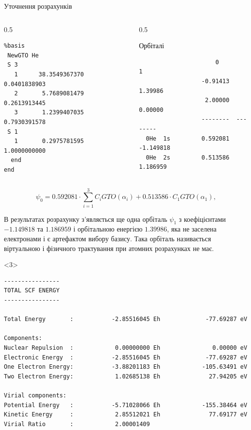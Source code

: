 \documentclass[10pt]{beamer}
\begin{document}
\begin{frame}[fragile]{Уточнення розрахунків}
\begin{onlyenv}
\begin{columns}[T]
\begin{column}{0.5\linewidth}
\begin{verbatim}
%basis
 NewGTO He
 S 3
   1      38.3549367370      0.0401838903
   2       5.7689081479      0.2613913445
   3       1.2399407035      0.7930391578
 S 1
   1       0.2975781595      1.0000000000
  end
end
    \end{verbatim}
			\end{column}
			\begin{column}{0.5\linewidth}\scriptsize\color{blue}
				\begin{center}
					\textcolor{black}{Орбіталі}
				\end{center}
				\begin{verbatim}
                      0         1
                  -0.91413   1.39986
                   2.00000   0.00000
                  --------  --------
  0He  1s         0.592081 -1.149818
  0He  2s         0.513586  1.186959
\end{verbatim}
			\end{column}
		\end{columns}
		\[
			\psi_{0} = 0.592081 \cdot \sum_{i = 1}^3 C_i GTO(\alpha_i)  + 0.513586 \cdot C_1  GTO(\alpha_1),
		\]
		\begin{alertblock}\scriptsize
			В результатах розрахунку з'являється ще одна орбіталь $\psi_1$ з коефіцієнтами $-1.149818$ та $1.186959$ і орбітальною енергією $1.39986$, яка не заселена електронами і є артефактом вибору базису. Така орбіталь називається \alert{віртуальною} і фізичного трактування при атомних розрахунках не має.
		\end{alertblock}
	\end{onlyenv}
	\begin{onlyenv}\scriptsize\color{blue}
		\begin{verbatim}
----------------
TOTAL SCF ENERGY
----------------

Total Energy       :           -2.85516045 Eh             -77.69287 eV

Components:
Nuclear Repulsion  :            0.00000000 Eh               0.00000 eV
Electronic Energy  :           -2.85516045 Eh             -77.69287 eV
One Electron Energy:           -3.88201183 Eh            -105.63491 eV
Two Electron Energy:            1.02685138 Eh              27.94205 eV

Virial components:
Potential Energy   :           -5.71028066 Eh            -155.38464 eV
Kinetic Energy     :            2.85512021 Eh              77.69177 eV
Virial Ratio       :            2.00001409
\end{verbatim}
	\end{onlyenv}
\end{frame}
\end{document}
